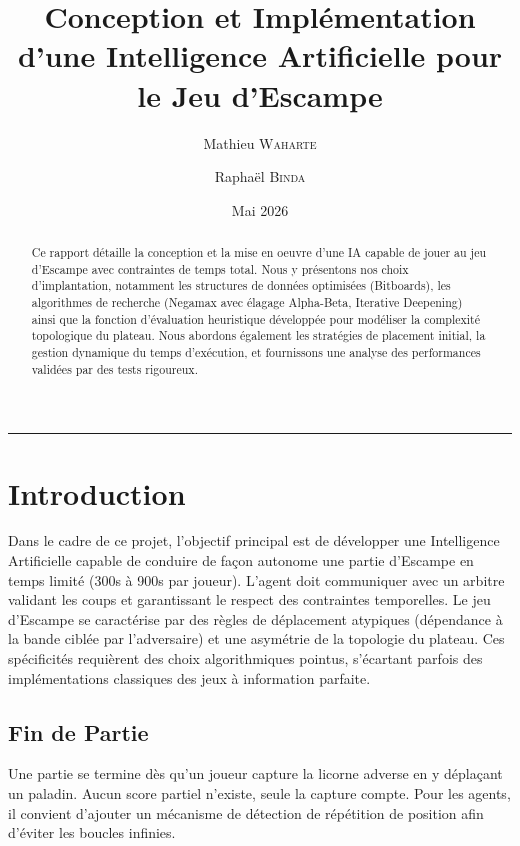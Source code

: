 \documentclass[12pt,a4paper]{article}
\title{
  \Large \textbf{Conception et Implémentation d'une Intelligence Artificielle pour le Jeu d'Escampe}\\[0.4em]
}
\author{
  Mathieu \textsc{Waharte} \and Raphaël \textsc{Binda}
}
\date{Mai 2026}
\begin{document}
\maketitle

\begin{abstract}
Ce rapport détaille la conception et la mise en oeuvre d'une IA capable de jouer au jeu d'Escampe avec contraintes de temps total. Nous y présentons nos choix d'implantation, notamment les structures de données optimisées (Bitboards), les algorithmes de recherche (Negamax avec élagage Alpha-Beta, Iterative Deepening) ainsi que la fonction d'évaluation heuristique développée pour modéliser la complexité topologique du plateau. Nous abordons également les stratégies de placement initial, la gestion dynamique du temps d'exécution, et fournissons une analyse des performances validées par des tests rigoureux.
\end{abstract}

\vspace{0.5em}
\noindent\rule{\linewidth}{0.4pt}
\tableofcontents
\vspace{1em}



\newpage
\section{Introduction}
Dans le cadre de ce projet, l'objectif principal est de développer une Intelligence Artificielle capable de conduire de façon autonome une partie d'Escampe en temps limité (300s à 900s par joueur). L'agent doit communiquer avec un arbitre validant les coups et garantissant le respect des contraintes temporelles.
Le jeu d'Escampe se caractérise par des règles de déplacement atypiques (dépendance à la bande ciblée par l'adversaire) et une asymétrie de la topologie du plateau. Ces spécificités requièrent des choix algorithmiques pointus, s'écartant parfois des implémentations classiques des jeux à information parfaite.


\subsection{Fin de Partie}
Une partie se termine dès qu'un joueur capture la licorne adverse en y déplaçant un paladin. Aucun score partiel n'existe, seule la capture compte. Pour les agents, il convient d'ajouter un mécanisme de détection de répétition de position afin d'éviter les boucles infinies.
\end{document}
